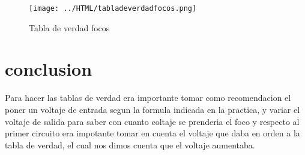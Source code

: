 \documentclass[11pt,a4paper]{article}
\begin{document}
\begin{figure}[h]
\centering
\texttt{[image: ../HTML/tabladeverdadfocos.png]} 
\caption{Tabla de verdad focos}
\end{figure}

\newpage 

\section{conclusion}
Para hacer las tablas de verdad era importante tomar como recomendacion el poner un voltaje de entrada segun la formula indicada en la practica, y variar el voltaje de salida para saber con cuanto coltaje se prenderia el foco y respecto al primer circuito era impotante tomar en cuenta el voltaje que daba en orden a la tabla de verdad, el cual nos dimos cuenta que el voltaje aumentaba.
\end{document}
